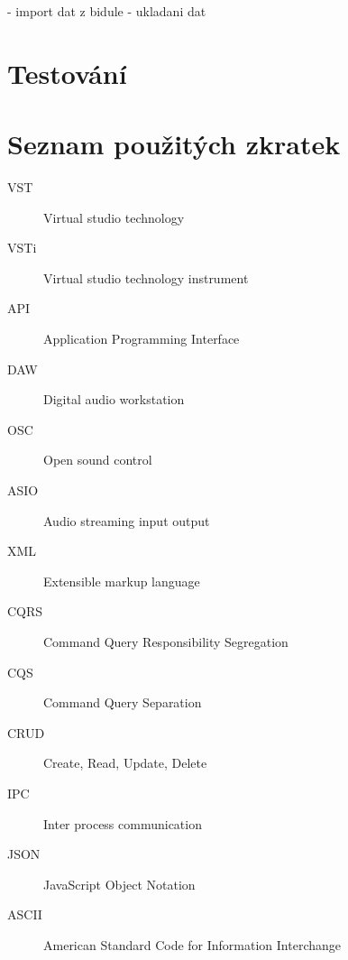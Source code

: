 \documentclass[thesis=M,czech]{FITthesis}[2019/03/06]
\begin{document}
	- import dat z bidule
	- ukladani dat
	
	
	\chapter{Testování}
	
	\begin{conclusion}
	\end{conclusion}
	
	
	
	
	\appendix
	
	\chapter{Seznam použitých zkratek}
	\begin{description}
		\item[VST] Virtual studio technology
		\item[VSTi] Virtual studio technology instrument
		\item[API] Application Programming Interface
		\item[DAW] Digital audio workstation
		\item[OSC] Open sound control
		\item[ASIO] Audio streaming input output
		\item[XML] Extensible markup language
		\item[CQRS] Command Query Responsibility Segregation
		\item[CQS] Command Query Separation
		\item[CRUD] Create, Read, Update, Delete
		\item[IPC] Inter process communication
		\item[JSON] JavaScript Object Notation
		\item[ASCII] American Standard Code for Information Interchange
	\end{description}
	
\end{document}
